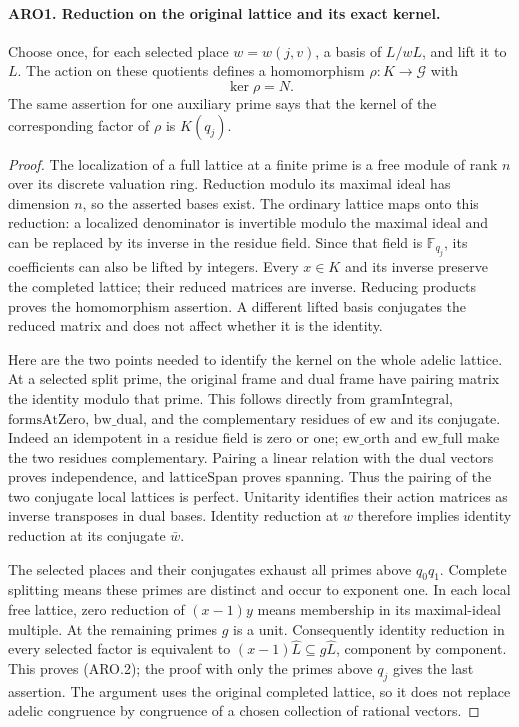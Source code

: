 \documentclass[11pt,a4paper]{article}
\numberwithin{equation}{section}
\theoremstyle{remark}\newtheorem{remark}[theorem]{Remark}
\begin{document}
\paragraph{ARO1. Reduction on the original lattice and its exact kernel.}
\label{claim:ARO1}
Choose once, for each selected place \(w=w(j,v)\), a basis of
\(L/wL\), and lift it to \(L\).  The action on these quotients defines
a homomorphism \(\rho:K\to\mathcal G\) with
\[
                         \ker\rho=N.                 \tag{ARO.2}
\]
The same assertion for one auxiliary prime says that the kernel of
the corresponding factor of \(\rho\) is \(K(q_j)\).
\begin{proof}
The localization of a full lattice at a finite prime is a free module
of rank \(n\) over its discrete valuation ring.  Reduction modulo its
maximal ideal has dimension \(n\), so the asserted bases exist.
The ordinary lattice maps onto this reduction: a localized
denominator is invertible modulo the maximal ideal and can be
replaced by its inverse in the residue field.  Since that field is
\(\mathbb F_{q_j}\), its coefficients can also be lifted by integers.
Every \(x\in K\) and its inverse preserve the completed lattice;
their reduced matrices are inverse.  Reducing products proves the
homomorphism assertion.  A different lifted basis conjugates the
reduced matrix and does not affect whether it is the identity.

Here are the two points needed to identify the kernel on the whole
adelic lattice.  At a selected split prime, the original frame and
dual frame have pairing matrix the identity modulo that prime.
This follows directly from \(\mathrm{gramIntegral}\),
\(\mathrm{formsAtZero}\), \(\mathrm{bw\_\allowbreak dual}\), and the
complementary residues of \(\mathrm{ew}\) and its conjugate.
Indeed an idempotent in a residue field is zero or one;
\(\mathrm{ew\_\allowbreak orth}\) and \(\mathrm{ew\_\allowbreak full}\) make the two
residues complementary.  Pairing a linear relation with the dual
vectors proves independence, and \(\mathrm{latticeSpan}\) proves
spanning.  Thus the pairing of the two conjugate local lattices is
perfect.  Unitarity identifies their action matrices as inverse
transposes in dual bases.  Identity reduction at \(w\) therefore
implies identity reduction at its conjugate \(\bar w\).

The selected places and their conjugates exhaust all primes above
\(q_0q_1\).  Complete splitting means these primes are distinct and
occur to exponent one.  In each local free lattice, zero reduction
of \((x-1)y\) means membership in its maximal-ideal multiple.
At the remaining primes \(g\) is a unit.  Consequently identity
reduction in every selected factor is equivalent to
\((x-1)\widehat L\subseteq g\widehat L\), component by component.
This proves (ARO.2); the proof with only the primes above \(q_j\)
gives the last assertion.  The argument uses the original completed
lattice, so it does not replace adelic congruence by congruence of a
chosen collection of rational vectors.
\end{proof}
\end{document}
